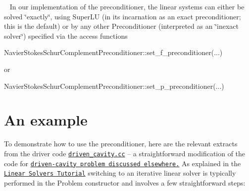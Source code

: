 ~\newline
 In our implementation of the preconditioner, the linear systems can either be solved \char`\"{}exactly\char`\"{}, using {\ttfamily Super\+LU} (in its incarnation as an exact preconditioner; this is the default) or by any other {\ttfamily Preconditioner} (interpreted as an \char`\"{}inexact solver\char`\"{}) specified via the access functions 
\begin{DoxyCode}
NavierStokesSchurComplementPreconditioner::set\_f\_preconditioner(...)
\end{DoxyCode}
 or 
\begin{DoxyCode}
NavierStokesSchurComplementPreconditioner::set\_p\_preconditioner(...)
\end{DoxyCode}




 

\hypertarget{index_example}{}\section{An example}\label{index_example}
To demonstrate how to use the preconditioner, here are the relevant extracts from the driver code \href{../../../../demo_drivers/linear_solvers/driven_cavity.cc}{\tt driven\+\_\+cavity.\+cc} -- a straightforward modification of the code for \href{../../../navier_stokes/driven_cavity/html/index.html}{\tt driven-\/cavity problem discussed elsewhere.} As explained in the \href{../../../linear_solvers/html/index.html}{\tt Linear Solvers Tutorial} switching to an iterative linear solver is typically performed in the {\ttfamily Problem} constructor and involves a few straightforward steps\+:


